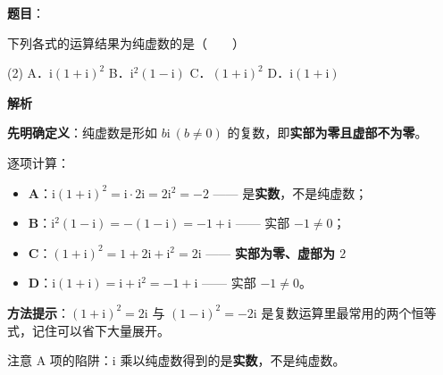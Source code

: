 \begin{answer}

\textbf{题目}：

下列各式的运算结果为纯虚数的是\mbox{（　　）}

\begin{gkopts}(2)
\task A．$\mathrm i(1+\mathrm i)^{2}$
\task B．$\mathrm i^{2}(1-\mathrm i)$
\task C．$(1+\mathrm i)^{2}$
\task D．$\mathrm i(1+\mathrm i)$
\end{gkopts}

\textbf{解析}

\textbf{先明确定义}：纯虚数是形如 $b\mathrm i\ (b\ne0)$ 的复数，即\textbf{实部为零且虚部不为零}。

逐项计算：

\begin{itemize}
\item \textbf{A}：$\mathrm i(1+\mathrm i)^{2}=\mathrm i\cdot2\mathrm i=2\mathrm i^{2}=-2$ —— 是\textbf{实数}，不是纯虚数；
\item \textbf{B}：$\mathrm i^{2}(1-\mathrm i)=-(1-\mathrm i)=-1+\mathrm i$ —— 实部 $-1\ne0$；
\item \textbf{C}：$(1+\mathrm i)^{2}=1+2\mathrm i+\mathrm i^{2}=2\mathrm i$ —— \textbf{实部为零、虚部为 $2$} 
\item \textbf{D}：$\mathrm i(1+\mathrm i)=\mathrm i+\mathrm i^{2}=-1+\mathrm i$ —— 实部 $-1\ne0$。
\end{itemize}

\begin{gktip}
\textbf{方法提示}：$(1+\mathrm i)^{2}=2\mathrm i$ 与 $(1-\mathrm i)^{2}=-2\mathrm i$ 是复数运算里最常用的两个恒等式，记住可以省下大量展开。

注意 A 项的陷阱：$\mathrm i$ 乘以纯虚数得到的是\textbf{实数}，不是纯虚数。
\end{gktip}


\par\medskip

\end{answer}
